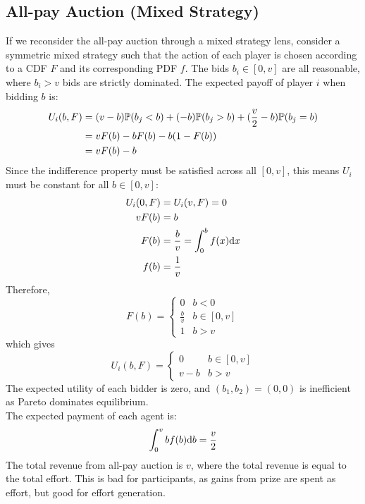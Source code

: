 \subsection{All-pay Auction (Mixed Strategy)}
If we reconsider the all-pay auction through a mixed strategy lens, consider a symmetric mixed strategy such that the action of each player is chosen according to a CDF $F$ and its corresponding PDF $f$. The bids $b_i \in [0, v]$ are all reasonable, where $b_i > v$ bids are strictly dominated. The expected payoff of player $i$ when bidding $b$ is:
\begin{align*}
    U_i(b, F) &= (v - b)\mathbb{P}(b_j < b) + (-b)\mathbb{P}(b_j > b) + (\frac{v}{2} - b)\mathbb{P}(b_j = b) \\
    &= vF(b) - bF(b) - b(1 - F(b)) \\
    &= vF(b) - b
\end{align*}
Since the indifference property must be satisfied across all $[0, v]$, this means $U_i$ must be constant for all $b \in [0, v]$:
\begin{align*}
    U_i(0, F) &= U_i(v, F) = 0 \\
    vF(b) &= b \\
    F(b) &= \frac{b}{v} = \int_{0}^{b} f(x) \dd x \\
    f(b) &= \frac{1}{v}
\end{align*}
Therefore, 
$$F(b) = \begin{cases}
    0 & b < 0 \\
    \frac{b}{v} & b \in [0, v] \\
    1 & b > v
\end{cases}$$
which gives
$$U_i(b, F) = \begin{cases}
    0 & b \in [0, v] \\
    v - b & b > v
\end{cases}$$
The expected utility of each bidder is zero, and $(b_1, b_2) = (0, 0)$ is inefficient as Pareto dominates equilibrium. \\
The expected payment of each agent is:
$$\int_{0}^{v} bf(b) \dd b = \frac{v}{2}$$
The total revenue from all-pay auction is $v$, where the total revenue is equal to the total effort. This is bad for participants, as gains from prize are spent as effort, but good for effort generation.

